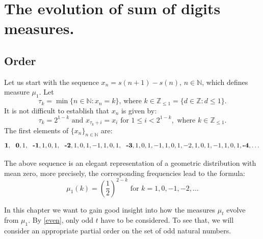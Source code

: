 \documentclass[10pt]{amsart}
\theoremstyle{definition}
\numberwithin{equation}{section}
\newcommand{\N}{\mathbb{N}}
\begin{document}
\section{  The  evolution of sum of digits measures.}\label{evo}
\subsection{Order}
Let us start with the sequence $x_n=s(n+1)-s(n)$, $n\in\N$, which defines measure $\mu_1$. Let $$\tau_k=\min\{n\in\N\colon x_n=k\}\mbox{, where }k\in\mathbb{Z}_{\leq 1}=\{d\in\mathbb{Z}\colon d\leq 1\}.$$
It is not difficult to establish that $x_n$ is given by:
 $$\tau_k=2^{1-k}\mbox{ and } x_{\tau_k+i}=x_i \mbox{ for } 1\leq i <2^{1-k},\mbox{ where } k\in\mathbb{Z}_{\leq 1}.$$ The first elements of $\{x_n\}_{n\in\N}$ are:\\
\small{
$$\textbf{1},\ \  \textbf{0}, 1, \ \ \textbf{-1}, 1, 0, 1,\ \ \textbf{-2}, 1, 0, 1, -1, 1, 0, 1,\ \ \textbf{-3},1, 0, 1, -1, 1, 0, 1,-2, 1, 0, 1, -1, 1, 0, 1,\textbf{-4},\dots\\ $$}

The above sequence  is an elegant representation of a geometric distribution with mean zero, more precisely, the corresponding frequencies lead to the formula:
\begin{equation}\label{mu1}
\mu_1(k)=\left(\frac{1}{2}\right)^{2-k}\mbox{ for } k=1,0,-1,-2,\dots
\end{equation}
 
In this chapter we want to gain good insight into how the measures $\mu_t$ evolve from $\mu_1$. By \eqref{even}, only odd $t$ have to be considered. %
To see that, we will consider an appropriate partial order on the set of odd natural numbers. %
\end{document}
